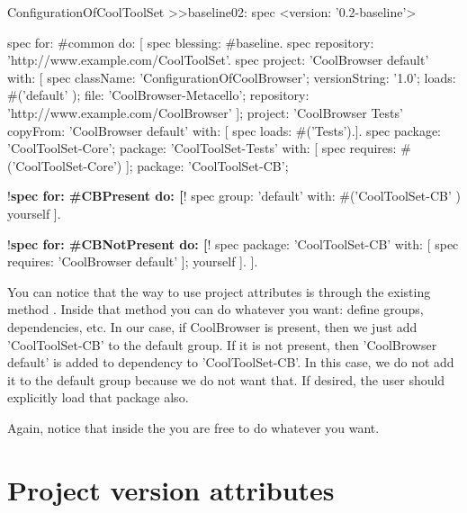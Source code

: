 \documentclass[a4paper,10pt,twoside]{book}
\begin{document}
\begin{code}{}
ConfigurationOfCoolToolSet >>baseline02: spec
       <version: '0.2-baseline'>

       spec for: #common do: [
              spec blessing: #baseline.
              spec repository: 'http://www.example.com/CoolToolSet'.
              spec project: 'CoolBrowser default' with: [
                            spec
                                   className: 'ConfigurationOfCoolBrowser';
                                   versionString: '1.0';
                                   loads: #('default' );
                                   file: 'CoolBrowser-Metacello';
                                   repository: 'http://www.example.com/CoolBrowser' ];
                     project: 'CoolBrowser Tests'
                            copyFrom: 'CoolBrowser default'
                            with: [ spec loads: #('Tests').].
              spec
                     package: 'CoolToolSet-Core';
                     package: 'CoolToolSet-Tests' with: [
                            spec requires: #('CoolToolSet-Core') ];
                     package: 'CoolToolSet-CB';

             !\textbf{spec for: \#CBPresent do: [}!
                     spec
                            group: 'default' with: #('CoolToolSet-CB' )
                            yourself ].

             !\textbf{spec for: \#CBNotPresent do: [}!
                     spec
                            package: 'CoolToolSet-CB' with: [ spec requires: 'CoolBrowser default' ];
                            yourself ].
                     ].

\end{code}

You can notice that the way to use project attributes is through the existing method . Inside that method you can do whatever you want: define groups, dependencies, etc. In our case, if CoolBrowser is present, then we just add 'CoolToolSet-CB' to the default group. If it is not present, then 'CoolBrowser default' is added to dependency to 'CoolToolSet-CB'. In this case, we do not add it to the default group because we do not want that. If desired, the user should explicitly load that package also.

Again, notice that inside the  you are free to do whatever you want.

\section{Project version attributes}
\end{document}

